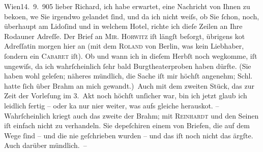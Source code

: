 \pstart
           \raggedleft{}{\pb}Wien14. 9. 905\pend
           \vspace{0.5em}
\pstart
           lieber Richard, ich habe erwartet, eine Nachricht von Ihnen zu
                  beko{\geminationm}en, we{\geminationn} Sie
               irgendwo gelandet{ }ſind, und da ich nicht weiſs, ob Sie{ }ſchon, noch, überhaupt am Lidoſind und in welchem Hotel, richte ich dieſe
               Zeilen an Ihre Rodauner Adreſſe. Der Brief an \textsc{Mir. Horwitz} iſt längſt beſorgt, übrigens ko{\geminationm}t Adreſſatin
               morgen hier an (mit dem \textsc{Roland} von Berlin, was kein Liebhaber,{ }ſondern ein
                  \textsc{Caba{\pb}ret} iſt). Ob und
               wann ich in dieſem Herbſt noch wegkomme, iſt ungewiſs, da ich wahrſcheinlich{ }ſehr
               bald Burgtheaterproben haben dürfte. (Sie haben
               wohl geleſen; näheres mündlich, die Sache iſt mir höchſt angenehm; Schl. hatte{ }ſich über Brahm an mich gewandt.) Auch mit dem zweiten Stück, das zur Zeit der Vorleſung im 3. Akt
               noch höchſt unſicher war, bin ich jetzt glaub ich leidlich fertig – oder ka{\geminationn} nur ni{\geminationm}er weiter, was
               aufs gleiche {\pb}herausko{\geminationm}t.
               – Wahrſcheinlich kriegt auch das zweite der Brahm; mit \textsc{Reinhardt} und den Seinen iſt einfach nicht zu verhandeln. Sie depeſchiren einem von
               Briefen, die auf dem Wege{ }ſind – und die nie geſchrieben wurden – und das iſt noch
               nicht das ärgſte. Auch darüber mündlich. –\pend
           
